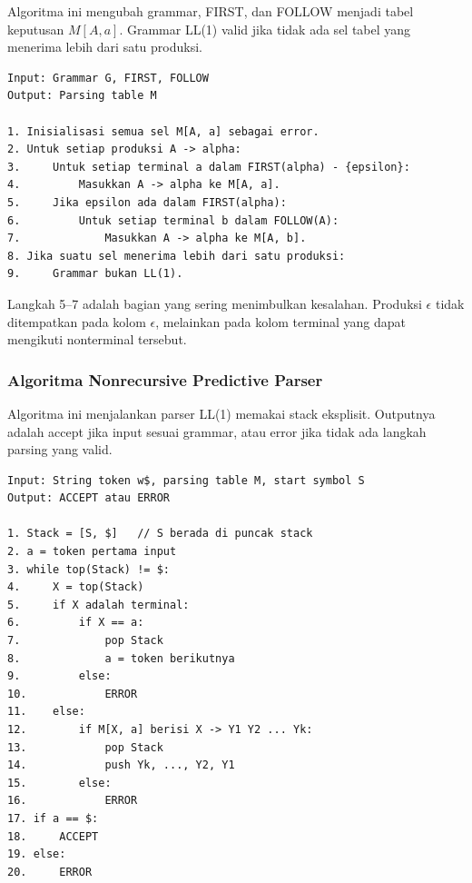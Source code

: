 \begin{jawab}
Algoritma ini mengubah grammar, FIRST, dan FOLLOW menjadi tabel keputusan $M[A,a]$. Grammar LL(1) valid jika tidak ada sel tabel yang menerima lebih dari satu produksi.
\end{jawab}

\begin{lstlisting}[caption={Pseudocode konstruksi tabel parsing LL(1)}, label={lst:konstruksi-tabel-ll1}]
Input: Grammar G, FIRST, FOLLOW
Output: Parsing table M

1. Inisialisasi semua sel M[A, a] sebagai error.
2. Untuk setiap produksi A -> alpha:
3.     Untuk setiap terminal a dalam FIRST(alpha) - {epsilon}:
4.         Masukkan A -> alpha ke M[A, a].
5.     Jika epsilon ada dalam FIRST(alpha):
6.         Untuk setiap terminal b dalam FOLLOW(A):
7.             Masukkan A -> alpha ke M[A, b].
8. Jika suatu sel menerima lebih dari satu produksi:
9.     Grammar bukan LL(1).
\end{lstlisting}

Langkah 5--7 adalah bagian yang sering menimbulkan kesalahan. Produksi $\epsilon$ tidak ditempatkan pada kolom $\epsilon$, melainkan pada kolom terminal yang dapat mengikuti nonterminal tersebut.

\subsubsection{Algoritma Nonrecursive Predictive Parser}

\begin{jawab}
Algoritma ini menjalankan parser LL(1) memakai stack eksplisit. Outputnya adalah accept jika input sesuai grammar, atau error jika tidak ada langkah parsing yang valid.
\end{jawab}

\begin{lstlisting}[caption={Pseudocode nonrecursive predictive parser}, label={lst:parser-ll1}]
Input: String token w$, parsing table M, start symbol S
Output: ACCEPT atau ERROR

1. Stack = [S, $]   // S berada di puncak stack
2. a = token pertama input
3. while top(Stack) != $:
4.     X = top(Stack)
5.     if X adalah terminal:
6.         if X == a:
7.             pop Stack
8.             a = token berikutnya
9.         else:
10.            ERROR
11.    else:
12.        if M[X, a] berisi X -> Y1 Y2 ... Yk:
13.            pop Stack
14.            push Yk, ..., Y2, Y1
15.        else:
16.            ERROR
17. if a == $:
18.     ACCEPT
19. else:
20.     ERROR
\end{lstlisting}

